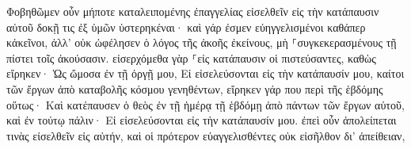 \documentclass{openreader}
\begin{document}
Φοβηθῶμεν οὖν μήποτε καταλειπομένης ἐπαγγελίας εἰσελθεῖν εἰς τὴν κατάπαυσιν αὐτοῦ δοκῇ τις ἐξ ὑμῶν ὑστερηκέναι· 
καὶ γάρ ἐσμεν εὐηγγελισμένοι καθάπερ κἀκεῖνοι, ἀλλ’ οὐκ ὠφέλησεν ὁ λόγος τῆς ἀκοῆς ἐκείνους, μὴ ⸀συγκεκερασμένους τῇ πίστει τοῖς ἀκούσασιν. 
εἰσερχόμεθα γὰρ ⸀εἰς κατάπαυσιν οἱ πιστεύσαντες, καθὼς εἴρηκεν· Ὡς ὤμοσα ἐν τῇ ὀργῇ μου, Εἰ εἰσελεύσονται εἰς τὴν κατάπαυσίν μου, καίτοι τῶν ἔργων ἀπὸ καταβολῆς κόσμου γενηθέντων, 
εἴρηκεν γάρ που περὶ τῆς ἑβδόμης οὕτως· Καὶ κατέπαυσεν ὁ θεὸς ἐν τῇ ἡμέρᾳ τῇ ἑβδόμῃ ἀπὸ πάντων τῶν ἔργων αὐτοῦ, 
καὶ ἐν τούτῳ πάλιν· Εἰ εἰσελεύσονται εἰς τὴν κατάπαυσίν μου. 
ἐπεὶ οὖν ἀπολείπεται τινὰς εἰσελθεῖν εἰς αὐτήν, καὶ οἱ πρότερον εὐαγγελισθέντες οὐκ εἰσῆλθον δι’ ἀπείθειαν, 
\end{document}
